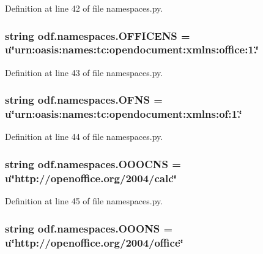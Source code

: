 Definition at line 42 of file namespaces.\+py.

\hypertarget{namespaceodf_1_1namespaces_ac0bdf67deb1a8159ffdc7497ffd809ee}{
\subsubsection[{O\+F\+F\+I\+C\+E\+N\+S}]{\setlength{\rightskip}{0pt plus 5cm}string odf.\+namespaces.\+O\+F\+F\+I\+C\+E\+N\+S = u\char`\"{}urn\+:oasis\+:names\+:tc\+:opendocument\+:xmlns\+:office\+:1.\char`\"{}}}\label{namespaceodf_1_1namespaces_ac0bdf67deb1a8159ffdc7497ffd809ee}


Definition at line 43 of file namespaces.\+py.

\hypertarget{namespaceodf_1_1namespaces_af5bf6a33e8f0f9e23d002976ae639eec}{
\subsubsection[{O\+F\+N\+S}]{\setlength{\rightskip}{0pt plus 5cm}string odf.\+namespaces.\+O\+F\+N\+S = u\char`\"{}urn\+:oasis\+:names\+:tc\+:opendocument\+:xmlns\+:of\+:1.\char`\"{}}}\label{namespaceodf_1_1namespaces_af5bf6a33e8f0f9e23d002976ae639eec}


Definition at line 44 of file namespaces.\+py.

\hypertarget{namespaceodf_1_1namespaces_a60d9bdbf2bffed667186346c8aa076a8}{
\subsubsection[{O\+O\+O\+C\+N\+S}]{\setlength{\rightskip}{0pt plus 5cm}string odf.\+namespaces.\+O\+O\+O\+C\+N\+S = u\char`\"{}http\+://openoffice.\+org/2004/calc\char`\"{}}}\label{namespaceodf_1_1namespaces_a60d9bdbf2bffed667186346c8aa076a8}


Definition at line 45 of file namespaces.\+py.

\hypertarget{namespaceodf_1_1namespaces_a3de5619020c605ca9d6411bb9d6dce52}{
\subsubsection[{O\+O\+O\+N\+S}]{\setlength{\rightskip}{0pt plus 5cm}string odf.\+namespaces.\+O\+O\+O\+N\+S = u\char`\"{}http\+://openoffice.\+org/2004/office\char`\"{}}}\label{namespaceodf_1_1namespaces_a3de5619020c605ca9d6411bb9d6dce52}


